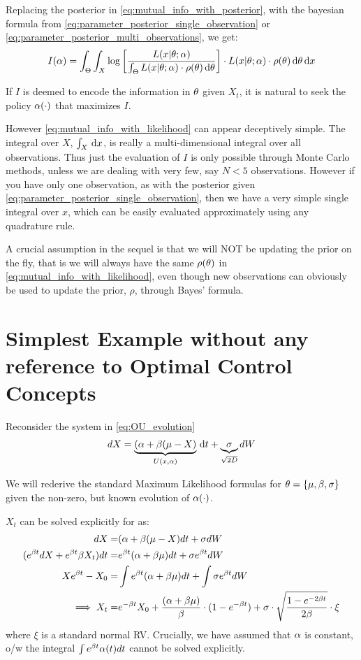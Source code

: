 Replacing the posterior in \cref{eq:mutual_info_with_posterior}, with the
bayesian formula from \cref{eq:parameter_posterior_single_observation} or
\ref{eq:parameter_posterior_multi_observations}, we get:
\begin{equation}
I(\alpha) = \int_\Theta \int_X  \log\left[\frac{L(x|{ \theta}; \alpha)}
										{\int_\Theta L(x|{ \theta};\alpha)\cdot \rho({ \theta}) \, \mathrm{d} { \theta}} \right] \cdot L(x|
										{ \theta};\alpha) \cdot \rho({ \theta}) \, \mathrm{d} { \theta} \, \mathrm{d} x
\label{eq:mutual_info_with_likelihood}
\end{equation}

If $I$ is deemed to encode the information in ${ \theta}$ given $X_t$, it is
natural to seek the policy $\alpha(\cdot)$ that maximizes $I$.

However \cref{eq:mutual_info_with_likelihood} can appear deceptively
simple. The integral over $X$, $\int_X \, \mathrm{d} x$, is really a multi-dimensional integral
over all observations. Thus just the evaluation of $I$ is only possible through
Monte Carlo methods, unless we are dealing with very few, say $N<5$ observations.
However if you have only one observation, as with the posterior given
\cref{eq:parameter_posterior_single_observation}, then we have a very simple
single integral over $x$, which can be easily evaluated approximately using any
quadrature rule.

A crucial assumption in the sequel is that we will NOT be updating the prior on
the fly, that is we will always have the same $\rho({ \theta})$ in
\cref{eq:mutual_info_with_likelihood}, even though new observations can
obviously be used to update the prior, $\rho$, through Bayes' formula.


\section{Simplest Example without any reference to Optimal Control Concepts}

Reconsider the system in \cref{eq:OU_evolution} 
$$
dX = \underbrace{(\alpha + \beta( \mu - X)}_{U(x,\alpha)} \, \mathrm{d} t +
\underbrace{\sigma}_{\sqrt{2D}} dW
$$

We will rederive the standard Maximum Likelihood formulas for ${ \theta} = \{{\mu }, \beta,
\sigma\}$ given the non-zero, but known evolution of $\alpha(\cdot)$.

$X_t$ can be solved explicitly for as:
\begin{align*}
dX =& (\alpha + \beta( \mu - X) dt + \sigma dW
\\
(e^{\beta t} dX + e^{\beta t}\beta X_t) dt
=&
e^{ \beta t}( \alpha + \beta {\mu }) dt + \sigma e^{\beta t} dW
\\
Xe^{\beta t} - X_0 =&
\int e^{ \beta t}( \alpha + \beta {\mu }) dt +  \int \sigma e^{\beta t} dW
\\
\implies
X_t =& e^{-\beta t} X_0 
		+ \frac{(\alpha + \beta {\mu })}{\beta} \cdot ( 1- e^{-\beta t}) +
	       \sigma  \cdot \sqrt\frac{{ 1 - e^{-2\beta t}}}{2\beta} \cdot \xi 
\end{align*}
where $\xi$ is a standard normal RV. Crucially, we have assumed that $\alpha$ is
constant, o/w the integral $\int e^{ \beta t}  \alpha(t) dt$ cannot be solved
explicitly.

